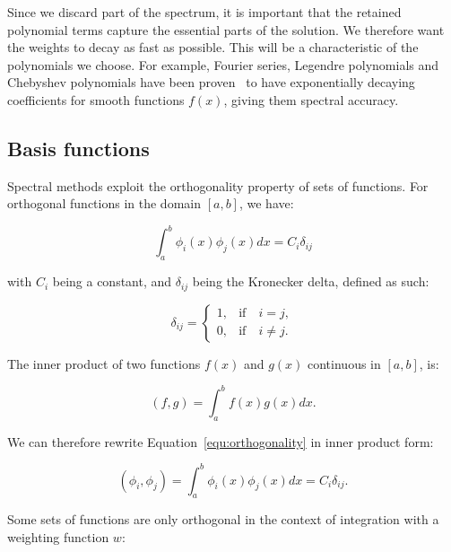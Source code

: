 Since we discard part of the spectrum, it is important that the retained polynomial terms capture
the essential parts of the solution. We therefore want the weights to decay as fast as possible.
This will be a characteristic of the polynomials we choose. For example, Fourier series, Legendre
polynomials and Chebyshev polynomials have been proven~\cite{Kopriva2009} to have exponentially
decaying coefficients for smooth functions \(f(x)\), giving them spectral accuracy.

\subsection{Basis functions}\label{subsection:spectral_element_method:spectral_approximation:basis_functions}

Spectral methods exploit the orthogonality property of sets of functions. For orthogonal
functions in the domain \([a, b]\), we have:

\begin{equation} \label{equ:orthogonality}
    \int_{a}^{b}\phi_i(x) \phi_j(x)dx = C_i \delta_{i j}
\end{equation}

\noindent
with \(C_i\) being a constant, and \(\delta_{i j}\) being the Kronecker delta, defined as such:

\begin{equation} \label{equ:kronecker}
    \delta _{i j} = \left \{ \begin{matrix}
                    1, & \textrm{if} \quad i = j,\\ 
                    0, & \textrm{if} \quad i \neq j.
                    \end{matrix} \right.
\end{equation}

The inner product of two functions \(f(x)\) and \(g(x)\) continuous in
\(\left[ a, b \right]\), is:

\begin{equation}
    \left( f, g \right) = \int_{a}^{b} f(x) g(x) dx.
\end{equation}

\noindent
We can therefore rewrite Equation~\ref{equ:orthogonality} in inner product form:

\begin{equation}
    \left( \phi_i, \phi_j \right) = \int_{a}^{b} \phi_i(x) \phi_j(x) dx = C_i \delta_{i j}.
\end{equation}

Some sets of functions are only orthogonal in the context of integration with a weighting function \(w\):

